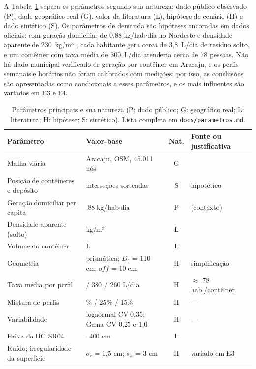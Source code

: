 A Tabela~\ref{tab:parametros} separa os parâmetros segundo sua natureza: dado
público observado (P), dado geográfico real (G), valor da literatura (L),
hipótese de cenário (H) e dado sintético (S). Os parâmetros de demanda são
hipóteses ancoradas em dados oficiais: com geração domiciliar de 0,88
kg/hab$\cdot$dia no Nordeste \cite[p.~26]{brasil2025sinisa} e densidade
aparente de 230~kg/m³ \cite{monteiro2001manual}, cada habitante gera cerca de
3,8~L/dia de resíduo solto, e um contêiner com taxa média de 300~L/dia
atenderia cerca de 78 pessoas. Não há dado municipal verificado de geração por
contêiner em Aracaju, e os perfis semanais e horários não foram calibrados com
medições; por isso, as conclusões são apresentadas como condicionais a esses
parâmetros, e os mais influentes são variados em E3 e E4.

\begin{table}[ht]
\centering
\caption{Parâmetros principais e sua natureza (P: dado público; G: geográfico real; L: literatura; H: hipótese; S: sintético). Lista completa em \texttt{docs/parametros.md}.}
\label{tab:parametros}
\scriptsize
\begin{tabularx}{\textwidth}{@{}>{\raggedright\arraybackslash}p{3.3cm}>{\raggedright\arraybackslash}p{3.0cm}c>{\raggedright\arraybackslash}X@{}}
\toprule
Parâmetro & Valor-base & Nat. & Fonte ou justificativa \\
\midrule
Malha viária & Aracaju, OSM, 45.011 nós & G & \cite{geofabrik2026nordeste} \\
Posição de contêineres e depósito & interseções sorteadas & S & hipotético \\
Geração domiciliar per capita & 0,88 kg/hab$\cdot$dia & P & \cite{brasil2025sinisa} (contexto) \\
Densidade aparente (solto) & 230 kg/m³ & L & \cite{monteiro2001manual} \\
Volume do contêiner & 1.100 L & L & \cite{monteiro2001manual} \\
Geometria & prismática; $D_0$ = 110 cm; $\mathit{off}$ = 10 cm & H & simplificação \\
Taxa média por perfil & 300 / 380 / 260 L/dia & H & $\approx$ 78 hab./contêiner \\
Mistura de perfis & 60\% / 25\% / 15\% & H & --- \\
Variabilidade & lognormal CV 0,35; Gama CV 0,25 e 1,0 & H & --- \\
Faixa do HC-SR04 & 2--400 cm & L & \cite{elecfreakssdhcsr04} \\
Ruído; irregularidade da superfície & $\sigma_r$ = 1,5 cm; $\sigma_s$ = 3 cm & H & variado em E3 \\

\end{tabularx}
\end{table}
